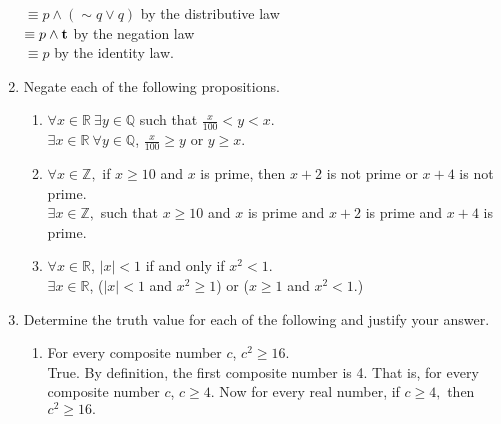\documentclass[12pt]{article}
\begin{document}
\begin{enumerate}
\hspace{1.6in} $\equiv p \wedge (\sim q \vee q)$ by the distributive law\\

\hspace{1.6in} $\equiv p \wedge {\bf{t}}$ by the negation law\\

\hspace{1.6in} $\equiv p$ by the identity law.\\

\item Negate each of the following propositions.\\
\begin{enumerate}
\item $\forall x \in \mathbb{R} \: \exists y \in \mathbb{Q}$ such that $\frac{x}{100} < y < x.$\\
$\exists x \in \mathbb{R} \: \forall y \in \mathbb{Q}$,  $\frac{x}{100} \geq y$ or $y \geq x.$\\
\item $\forall x \in \mathbb{Z},$ if $x \geq 10$ and $x$ is prime, then $x+2$ is not prime or $x+4$ is not prime.\\
$\exists x \in \mathbb{Z},$ such that $x \geq 10$ and $x$ is prime and $x+2$ is prime and $x+4$ is prime.\\
\item $\forall x \in \mathbb{R}$, $|x|<1$ if and only if $x^2<1.$\\
$\exists x \in \mathbb{R}$, ($|x|<1$ and $x^2 \geq 1$) or ($x\geq 1$ and $x^2<1.$)
\end{enumerate}

\item Determine the truth value for each of the following and justify your answer.
\begin{enumerate}
\item For every composite number $c$, $c^2 \geq 16.$\\
True. By definition, the first composite number is 4. That is, for every composite number $c$, $c \geq 4.$ Now for every real number, if $c\geq 4,$ then $c^2 \geq 16.$\\


\end{enumerate}
\end{enumerate}
\end{document}
